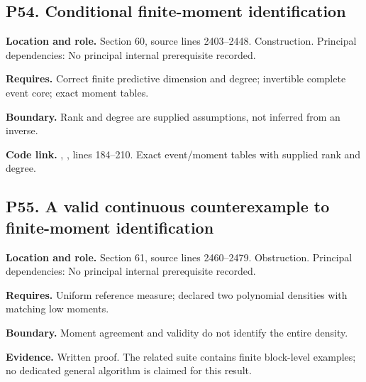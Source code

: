 \documentclass[11pt,oneside,openany]{book}
\numberwithin{equation}{section}
\begin{document}
\par\noindent\begin{minipage}{\textwidth}
\subsection{P54. Conditional finite-moment
identification}\label{LSMRegister:p54.-conditional-finite-moment-identification}

\textbf{Location and role.} Section 60, source lines 2403--2448.
Construction. Principal dependencies: No principal internal prerequisite
recorded.

\textbf{Requires.} Correct finite predictive dimension and degree;
invertible complete event core; exact moment tables.

\textbf{Boundary.} Rank and degree are supplied assumptions, not
inferred from an inverse.

\textbf{Code link.} ,
, lines 184--210. Exact event/moment
tables with supplied rank and degree.
\end{minipage}\par\medskip

\par\noindent\begin{minipage}{\textwidth}
\subsection{P55. A valid continuous counterexample to finite-moment
identification}\label{LSMRegister:p55.-a-valid-continuous-counterexample-to-finite-moment-identification}

\textbf{Location and role.} Section 61, source lines 2460--2479.
Obstruction. Principal dependencies: No principal internal prerequisite
recorded.

\textbf{Requires.} Uniform reference measure; declared two polynomial
densities with matching low moments.

\textbf{Boundary.} Moment agreement and validity do not identify the
entire density.

\textbf{Evidence.} Written proof. The related suite contains finite
block-level examples; no dedicated general algorithm is claimed for this
result.
\end{minipage}\par\medskip
\end{document}
